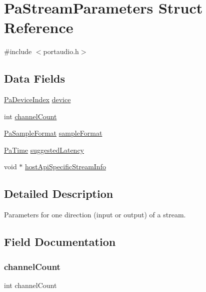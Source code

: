 \hypertarget{struct_pa_stream_parameters}{}\section{Pa\+Stream\+Parameters Struct Reference}
\label{struct_pa_stream_parameters}


{\ttfamily \#include $<$portaudio.\+h$>$}

\subsection*{Data Fields}
\begin{DoxyCompactItemize}
\item 
\hyperlink{portaudio_8h_ad79317e65bde63d76c4b8e711ac5a361}{Pa\+Device\+Index} \hyperlink{struct_pa_stream_parameters_a17f35b803980e0265685e1838a3ea60c}{device}
\item 
int \hyperlink{struct_pa_stream_parameters_a627c12924294173b6f8409a90e07b980}{channel\+Count}
\item 
\hyperlink{portaudio_8h_a4582d93c2c2e60e12be3d74c5fe00b96}{Pa\+Sample\+Format} \hyperlink{struct_pa_stream_parameters_ab1ffdd5f8a485c9733975ab81f7f5e5c}{sample\+Format}
\item 
\hyperlink{portaudio_8h_af17a7e6d0471a23071acf8dbd7bbe4bd}{Pa\+Time} \hyperlink{struct_pa_stream_parameters_aff6312de977fdaa040088963cdd92236}{suggested\+Latency}
\item 
void $\ast$ \hyperlink{struct_pa_stream_parameters_a04c386f76b545ad10b1ad925297175ff}{host\+Api\+Specific\+Stream\+Info}
\end{DoxyCompactItemize}


\subsection{Detailed Description}
Parameters for one direction (input or output) of a stream. 

\subsection{Field Documentation}
\mbox{\label{struct_pa_stream_parameters_a627c12924294173b6f8409a90e07b980}} 
\subsubsection{\texorpdfstring{channel\+Count}{channelCount}}
{\footnotesize\ttfamily int channel\+Count}

